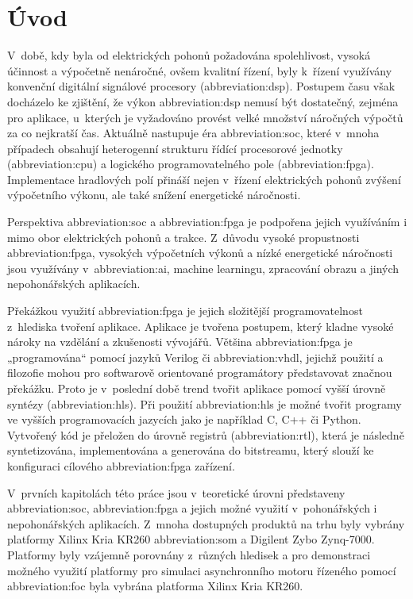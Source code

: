 \documentclass[a4paper, twoside, 11pt]{article}
\begin{document}
\section{Úvod}
V~době, kdy byla od elektrických pohonů požadována spolehlivost, vysoká účinnost a výpočetně nenáročné, ovšem kvalitní řízení, byly k~řízení využívány konvenční digitální signálové procesory (\gls{abbreviation:dsp}). Postupem času však docházelo ke zjištění, že výkon \gls{abbreviation:dsp} nemusí být dostatečný, zejména pro aplikace, u~kterých je vyžadováno provést velké množství náročných výpočtů za co nejkratší čas. Aktuálně nastupuje éra \gls{abbreviation:soc}, které v~mnoha případech obsahují heterogenní strukturu řídící procesorové jednotky (\gls{abbreviation:cpu}) a logického programovatelného pole (\gls{abbreviation:fpga}). Implementace hradlových polí přináší nejen v~řízení elektrických pohonů zvýšení výpočetního výkonu, ale také snížení energetické náročnosti.\par
Perspektiva \gls{abbreviation:soc} a \gls{abbreviation:fpga} je podpořena jejich využíváním i mimo obor elektrických pohonů a trakce. Z~důvodu vysoké propustnosti \gls{abbreviation:fpga}, vysokých výpočetních výkonů a nízké energetické náročnosti jsou využívány v~\gls{abbreviation:ai}, machine learningu, zpracování obrazu a jiných nepohonářských aplikacích.\par
Překážkou využití \gls{abbreviation:fpga} je jejich složitější programovatelnost z~hlediska tvoření aplikace. Aplikace je tvořena postupem, který kladne vysoké nároky na vzdělání a zkušenosti vývojářů. Většina \gls{abbreviation:fpga} je „programována“ pomocí jazyků Verilog či \gls{abbreviation:vhdl}, jejichž použití a filozofie mohou pro softwarově orientované programátory představovat značnou překážku. Proto je v~poslední době trend tvořit aplikace pomocí vyšší úrovně syntézy (\gls{abbreviation:hls}). Při použití \gls{abbreviation:hls} je možné tvořit programy ve vyšších programovacích jazycích jako je například C, C++ či Python. Vytvořený kód je přeložen do úrovně registrů (\gls{abbreviation:rtl}), která je následně syntetizována, implementována a generována do bitstreamu, který slouží ke konfiguraci cílového \gls{abbreviation:fpga} zařízení.\par
V~prvních kapitolách této práce jsou v~teoretické úrovni představeny \gls{abbreviation:soc}, \gls{abbreviation:fpga} a jejich možné využití v~pohonářských i nepohonářských aplikacích. Z~mnoha dostupných produktů na trhu byly vybrány platformy Xilinx Kria KR260 \gls{abbreviation:som} a Digilent Zybo Zynq-7000. Platformy byly vzájemně porovnány z~různých hledisek a pro demonstraci možného využití platformy pro simulaci asynchronního motoru řízeného pomocí \gls{abbreviation:foc} byla vybrána platforma Xilinx Kria KR260.\par
\end{document}
